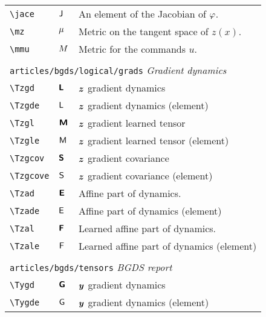 \begin{longtable}{lll}
 {\color[rgb]{0.5,0.5,0.5}\texttt{\textbackslash jace}} & ${\mathsf{J}}$ &  An element of the Jacobian of $\varphi$.\\ 
 {\color[rgb]{0.5,0.5,0.5}\texttt{\textbackslash mz}} & $\mu$ &  Metric on the tangent space of $z(x)$.\\ 
 {\color[rgb]{0.5,0.5,0.5}\texttt{\textbackslash mmu}} & $M$ &  Metric for the commands $u$. \\ 
  &  & \\ 
 \multicolumn{3}{l}{{\color[rgb]{0.5,0.5,0.5}\texttt{articles/bgds/logical/grads}} \emph{Gradient dynamics}}\\ 
 \hline
{\color[rgb]{0.5,0.5,0.5}\texttt{\textbackslash Tzgd}} & $\boldsymbol{{\mathsf{L}}}$ &  $\boldsymbol{z}$  gradient dynamics\\ 
 {\color[rgb]{0.5,0.5,0.5}\texttt{\textbackslash Tzgde}} & ${\mathsf{L}}$ &  $\boldsymbol{z}$  gradient dynamics (element)\\ 
 {\color[rgb]{0.5,0.5,0.5}\texttt{\textbackslash Tzgl}} & $\boldsymbol{{\mathsf{M}}}$ &  $\boldsymbol{z}$  gradient  learned tensor \\ 
 {\color[rgb]{0.5,0.5,0.5}\texttt{\textbackslash Tzgle}} & ${\mathsf{M}}$ &  $\boldsymbol{z}$  gradient  learned tensor (element)\\ 
 {\color[rgb]{0.5,0.5,0.5}\texttt{\textbackslash Tzgcov}} & $\boldsymbol{{\mathsf{S}}}$ &  $\boldsymbol{z}$  gradient  covariance\\ 
 {\color[rgb]{0.5,0.5,0.5}\texttt{\textbackslash Tzgcove}} & ${\mathsf{S}}$ &  $\boldsymbol{z}$  gradient  covariance (element)\\ 
 {\color[rgb]{0.5,0.5,0.5}\texttt{\textbackslash Tzad}} & $\boldsymbol{{\mathsf{E}}}$ &  Affine part of dynamics.\\ 
 {\color[rgb]{0.5,0.5,0.5}\texttt{\textbackslash Tzade}} & ${\mathsf{E}}$ &  Affine part of dynamics (element)\\ 
 {\color[rgb]{0.5,0.5,0.5}\texttt{\textbackslash Tzal}} & $\boldsymbol{{\mathsf{F}}}$ &  Learned affine part of dynamics.\\ 
 {\color[rgb]{0.5,0.5,0.5}\texttt{\textbackslash Tzale}} & ${\mathsf{F}}$ &  Learned affine part of dynamics (element)\\ 
  &  & \\ 
 \multicolumn{3}{l}{{\color[rgb]{0.5,0.5,0.5}\texttt{articles/bgds/tensors}} \emph{BGDS report}}\\ 
 \hline
{\color[rgb]{0.5,0.5,0.5}\texttt{\textbackslash Tygd}} & $\boldsymbol{{\mathsf{G}}}$ &  $\boldsymbol{y}$ gradient dynamics\\ 
 {\color[rgb]{0.5,0.5,0.5}\texttt{\textbackslash Tygde}} & ${\mathsf{G}}$ &  $\boldsymbol{y}$ gradient dynamics (element)\\ 

\end{longtable}
